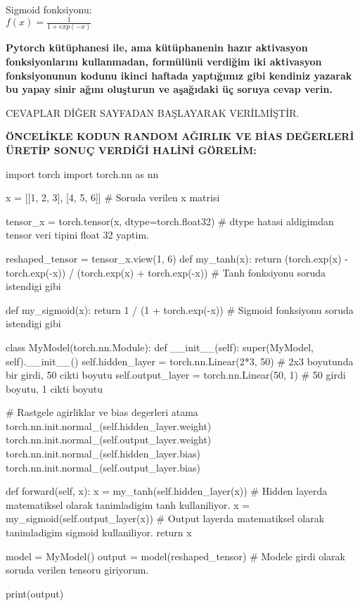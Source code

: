 \documentclass[11pt]{article}
\begin{document}
Sigmoid fonksiyonu:\\
$f(x) = \frac{1}{1 + exp(-x)}$

\vspace{.2in}
 \textbf{Pytorch kütüphanesi ile, ama kütüphanenin hazır aktivasyon fonksiyonlarını kullanmadan, formülünü verdiğim iki aktivasyon fonksiyonunun kodunu ikinci haftada yaptığımız gibi kendiniz yazarak bu yapay sinir ağını oluşturun ve aşağıdaki üç soruya cevap verin.}

 CEVAPLAR DİĞER SAYFADAN BAŞLAYARAK VERİLMİŞTİR.
 \newpage

 


\textbf{ÖNCELİKLE KODUN RANDOM AĞIRLIK VE BİAS DEĞERLERİ ÜRETİP SONUÇ VERDİĞİ HALİNİ GÖRELİM:}

 \begin{python}
import torch
import torch.nn as nn


x = [[1, 2, 3], [4, 5, 6]]                      # Soruda verilen x matrisi

tensor_x = torch.tensor(x, dtype=torch.float32) # dtype hatasi aldigimdan tensor veri tipini float 32 yaptim.

reshaped_tensor = tensor_x.view(1, 6)           
def my_tanh(x):
    return (torch.exp(x) - torch.exp(-x)) / (torch.exp(x) + torch.exp(-x)) # Tanh fonksiyonu soruda istendigi gibi 

def my_sigmoid(x):
    return 1 / (1 + torch.exp(-x))                             # Sigmoid fonksiyonu soruda istendigi gibi

class MyModel(torch.nn.Module):
    def __init__(self):
        super(MyModel, self).__init__()
        self.hidden_layer = torch.nn.Linear(2*3, 50)  # 2x3 boyutunda bir girdi, 50 cikti boyutu
        self.output_layer = torch.nn.Linear(50, 1)  # 50 girdi boyutu, 1 cikti boyutu

        # Rastgele agirliklar ve bias degerleri atama
        torch.nn.init.normal_(self.hidden_layer.weight)
        torch.nn.init.normal_(self.output_layer.weight)
        torch.nn.init.normal_(self.hidden_layer.bias)
        torch.nn.init.normal_(self.output_layer.bias)

    def forward(self, x):
        x = my_tanh(self.hidden_layer(x)) # Hidden layerda matematiksel olarak tanimladigim tanh kullaniliyor.
        x = my_sigmoid(self.output_layer(x)) # Output layerda matematiksel olarak tanimladigim sigmoid kullaniliyor.
        return x

model = MyModel()
output = model(reshaped_tensor) # Modele girdi olarak soruda verilen tensoru giriyorum.

print(output)

 \end{python}
 \newpage
\end{document}
